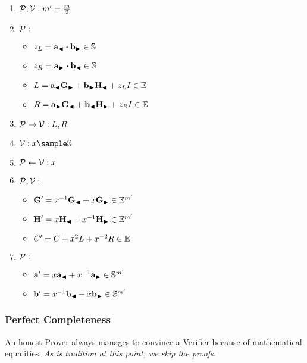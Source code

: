 \begin{enumerate}
    \item \hfill $\mathcal{P}, \mathcal{V}: m' = \frac{m}{2}$
    \item $\mathcal{P}:$
        \begin{itemize}
            \item $z_L = \mathbf{a}_{\blacktriangleleft} \boldsymbol{\cdot} \mathbf{b}_{\blacktriangleright} \in \mathbb{S}$
            \item $z_R = \mathbf{a}_{\blacktriangleright} \boldsymbol{\cdot} \mathbf{b}_{\blacktriangleleft} \in \mathbb{S}$
            \item $L = \mathbf{a}_{\blacktriangleleft} \mathbf{G}_{\blacktriangleright} + \mathbf{b}_{\blacktriangleright} \mathbf{H}_{\blacktriangleleft} + z_L I \in \mathbb{E}$
            \item $R = \mathbf{a}_{\blacktriangleright} \mathbf{G}_{\blacktriangleleft} + \mathbf{b}_{\blacktriangleleft} \mathbf{H}_{\blacktriangleright} + z_R I \in \mathbb{E}$
        \end{itemize}
    \item $\mathcal{P} \to \mathcal{V}: L, R$
    \item \hfill $\verifier: x \sample \scalars$
    \item \hfill $\mathcal{P} \leftarrow \mathcal{V}: x$
    \item \hfill $\mathcal{P}, \mathcal{V}:$
        \begin{itemize}
            \item \hfill $\mathbf{G}' = x^{-1}\mathbf{G}_{\blacktriangleleft} + x\mathbf{G}_{\blacktriangleright} \in \mathbb{E}^{m'}$
            \item \hfill $\mathbf{H}' = x\mathbf{H}_{\blacktriangleleft} + x^{-1}\mathbf{H}_{\blacktriangleright} \in \mathbb{E}^{m'}$
            \item \hfill $C' = C + x^2L + x^{-2}R \in \mathbb{E}$
        \end{itemize}
    \item $\mathcal{P}:$
        \begin{itemize}
            \item $\mathbf{a'} = x \mathbf{a}_{\blacktriangleleft} + x^{-1} \mathbf{a}_{\blacktriangleright} \in \mathbb{S}^{m'}$
            \item $\mathbf{b}' = x^{-1} \mathbf{b}_{\blacktriangleleft} + x \mathbf{b}_{\blacktriangleright} \in \mathbb{S}^{m'}$
        \end{itemize}
\end{enumerate}

\subsubsection{Perfect Completeness}

An honest Prover always manages to convince a Verifier because of mathematical equalities.
\emph{As is tradition at this point, we skip the proofs.}

